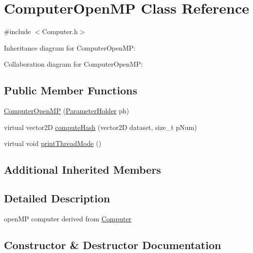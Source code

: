 \hypertarget{classComputerOpenMP}{}\section{Computer\+Open\+MP Class Reference}
\label{classComputerOpenMP}


{\ttfamily \#include $<$Computer.\+h$>$}



Inheritance diagram for Computer\+Open\+MP\+:


Collaboration diagram for Computer\+Open\+MP\+:
\subsection*{Public Member Functions}
\begin{DoxyCompactItemize}
\item 
\hyperlink{classComputerOpenMP_a4e8a4180d0afbd679176af3c6abe41d2}{Computer\+Open\+MP} (\hyperlink{structParameterHolder}{Parameter\+Holder} ph)
\item 
virtual vector2D \hyperlink{classComputerOpenMP_a394526cd5c4075de81a60c92ee3e0e0f}{compute\+Hash} (vector2D dataset, size\+\_\+t p\+Num)
\item 
virtual void \hyperlink{classComputerOpenMP_a07f65269e96f3d587e7a4592967b548f}{print\+Thread\+Mode} ()
\end{DoxyCompactItemize}
\subsection*{Additional Inherited Members}


\subsection{Detailed Description}
open\+MP computer derived from \hyperlink{classComputer}{Computer} 

\subsection{Constructor \& Destructor Documentation}
